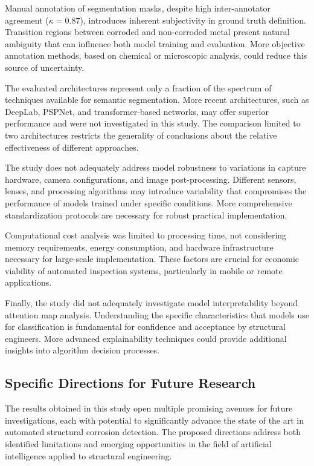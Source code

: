 \documentclass[12pt,a4paper,twoside]{article}
\begin{document}
Manual annotation of segmentation masks, despite high inter-annotator agreement ($\kappa = 0.87$), introduces inherent subjectivity in ground truth definition. Transition regions between corroded and non-corroded metal present natural ambiguity that can influence both model training and evaluation. More objective annotation methods, based on chemical or microscopic analysis, could reduce this source of uncertainty.

The evaluated architectures represent only a fraction of the spectrum of techniques available for semantic segmentation. More recent architectures, such as DeepLab, PSPNet, and transformer-based networks, may offer superior performance and were not investigated in this study. The comparison limited to two architectures restricts the generality of conclusions about the relative effectiveness of different approaches.

The study does not adequately address model robustness to variations in capture hardware, camera configurations, and image post-processing. Different sensors, lenses, and processing algorithms may introduce variability that compromises the performance of models trained under specific conditions. More comprehensive standardization protocols are necessary for robust practical implementation.

Computational cost analysis was limited to processing time, not considering memory requirements, energy consumption, and hardware infrastructure necessary for large-scale implementation. These factors are crucial for economic viability of automated inspection systems, particularly in mobile or remote applications.

Finally, the study did not adequately investigate model interpretability beyond attention map analysis. Understanding the specific characteristics that models use for classification is fundamental for confidence and acceptance by structural engineers. More advanced explainability techniques could provide additional insights into algorithm decision processes.

\subsection{Specific Directions for Future Research}
\label{subsec:future_work}

The results obtained in this study open multiple promising avenues for future investigations, each with potential to significantly advance the state of the art in automated structural corrosion detection. The proposed directions address both identified limitations and emerging opportunities in the field of artificial intelligence applied to structural engineering.
\end{document}

